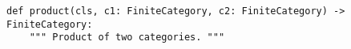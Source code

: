 \begin{verbatim}
def product(cls, c1: FiniteCategory, c2: FiniteCategory) -> FiniteCategory:
    """ Product of two categories. """
\end{verbatim}